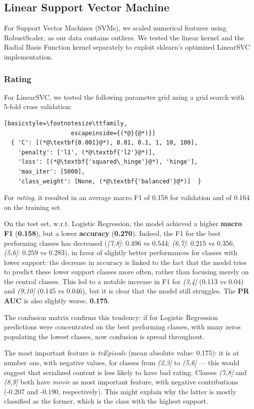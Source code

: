\subsection{Linear Support Vector Machine}
For Support Vector Machines (SVMs), we scaled numerical features using RobustScaler, as our data contains outliers. We tested the linear kernel and the Radial Basis Function kernel separately to exploit sklearn's optimized LinearSVC implementation.

\subsubsection{Rating}
For LinearSVC, we tested the following parameter grid using a grid search with 5-fold cross validation:

\begin{lstlisting}[basicstyle=\footnotesize\ttfamily,
                   escapeinside={(*@}{@*)}]
  { 'C': [(*@\textbf{0.001}@*), 0.01, 0.1, 1, 10, 100],
    'penalty': ['l1', (*@\textbf{'l2'}@*)],
    'loss': [(*@\textbf{'squared\_hinge'}@*), 'hinge'],
    'max_iter': [5000],
    'class_weight': [None, (*@\textbf{'balanced'}@*)]  }
\end{lstlisting}

For \textit{rating}, it resulted in an average macro F1 of 0.158 for validation and of 0.164 on the training set.

On the test set, w.r.t. Logistic Regression, the model achieved a higher \textbf{macro F1} (\textbf{0.158}), but a lower \textbf{accuracy} (\textbf{0.270}).
Indeed, the F1 for the best performing classes has decreased (\textit{(7,8]}: 0.496 vs 0.544; \textit{(6,7]}: 0.215 vs 0.356, \textit{(5,6]}: 0.259 vs 0.283), in favor of slightly better performances for classes with lower support: the decrease in accuracy is linked to the fact that the model tries to predict these lower support classes more often, rather than focusing merely on the central classes. This led to a notable increase in F1 for \textit{(3,4]} (0.113 vs 0.04) and \textit{(9,10]} (0.145 vs 0.046), but it is clear that the model still struggles. The \textbf{PR AUC} is also slightly worse, \textbf{0.175}.

The confusion matrix confirms this tendency: if for Logistic Regression predictions were concentrated on the best performing classes, with many zeros populating the lowest classes, now confusion is spread throughout. 

The most important feature is \textit{tvEpisode} (mean absolute value: 0.175): it is at number one, with negative values, for classes from \textit{(2,3]} to \textit{(5,6] }— this would suggest that serialized content is less likely to have bad rating. Classes \textit{(7,8]} and \textit{(8,9]} both have \textit{movie} as most important feature, with negative contributions (-0.207 and -0.190, respectively). This might explain why the latter is mostly classified as the former, which is the class with the highest support.

